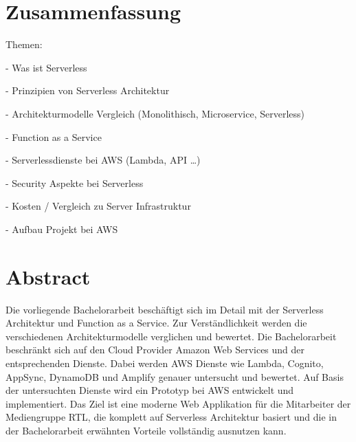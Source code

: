 
\section*{Zusammenfassung}
Themen:

- Was ist Serverless

- Prinzipien von Serverless Architektur

- Architekturmodelle Vergleich (Monolithisch, Microservice, Serverless)

- Function as a Service

- Serverlessdienste bei AWS (Lambda, API …)

- Security Aspekte bei Serverless

- Kosten / Vergleich zu Server Infrastruktur

- Aufbau Projekt bei AWS

\section*{Abstract}

Die vorliegende Bachelorarbeit beschäftigt sich im Detail mit der Serverless Architektur und Function as a Service.
Zur Verständlichkeit werden die verschiedenen Architekturmodelle verglichen und bewertet.
Die Bachelorarbeit beschränkt sich auf den Cloud Provider Amazon Web Services und der entsprechenden Dienste.
Dabei werden AWS Dienste wie Lambda, Cognito, AppSync, DynamoDB und Amplify genauer untersucht und bewertet.
Auf Basis der untersuchten Dienste wird ein Prototyp bei AWS entwickelt und implementiert.
Das Ziel ist eine moderne Web Applikation für die Mitarbeiter der Mediengruppe RTL, die komplett auf Serverless Architektur basiert
und die in der Bachelorarbeit erwähnten Vorteile vollständig ausnutzen kann.




\cleardoublepage
